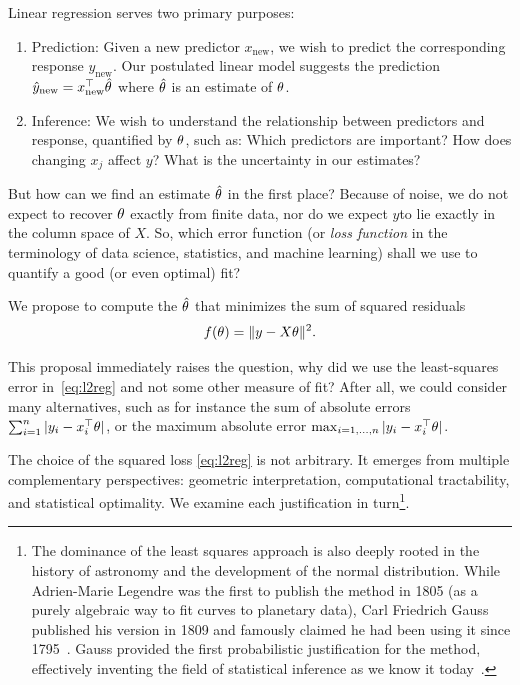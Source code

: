 \smallskip
Linear regression serves two primary purposes:
\begin{enumerate}
\item Prediction: Given a new predictor $x_{\text{new}}$, we wish to predict 
the corresponding response $y_{\text{new}}$. Our postulated linear model suggests the prediction
$\hat{y}_{\text{new}} = x_{\text{new}}^\top \hat{\theta}$
where $\hat{\theta}$ is an estimate of $\theta$.
\item Inference: We wish to understand the relationship between predictors and 
response, quantified by $\theta$, such as: Which predictors are important?  How does changing $x_j$ affect $y$? 
What is the uncertainty in our estimates? 
\end{enumerate}

But how can we find an estimate $\hat{\theta}$ in the first place? 
Because of noise, we do not expect to recover $\theta$ exactly from finite data, nor do we expect $y$to lie exactly in the column space of $X$.
So, which error function (or {\em loss function} in the terminology of data science, statistics, and machine learning) shall we use to quantify a good (or even optimal) fit? 

We propose to compute the $\hat{\theta}$ that minimizes the sum of squared residuals
\begin{equation}\label{eq:l2reg}
f(\theta) = \|y - X\theta\|^2.   
\end{equation}

This proposal immediately raises the question, why did we use the least-squares error in~\eqref{eq:l2reg} and not some other measure of fit?
After all, we could consider many alternatives, such as for instance the sum of absolute errors $\sum_{i=1}^n |y_i -x_i^\top\theta|$, or the maximum absolute error $\max_{i=1,\ldots,n} |y_i - x_i^\top\theta|$. 

The choice of the squared loss \eqref{eq:l2reg} is not arbitrary. It emerges from multiple 
complementary perspectives: geometric interpretation, 
computational tractability, and statistical optimality. We examine each justification in turn\footnote{The dominance of the least squares approach is also deeply rooted in the history of astronomy and the development of the normal distribution.
While Adrien-Marie Legendre was the first to publish the method in 1805 (as a purely algebraic way to fit curves to planetary data), Carl Friedrich Gauss published his version in 1809 and famously claimed he had been using it since 1795~\cite{stigler1981gauss}. Gauss provided the first probabilistic justification for the method, effectively inventing the field of statistical inference as we know it today~\cite{stigler1990history}.}.

